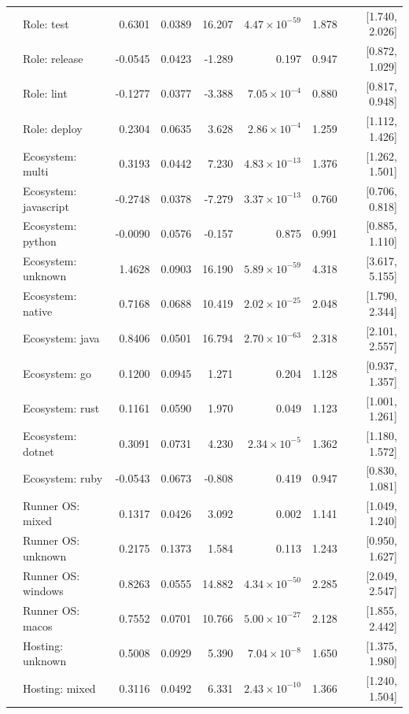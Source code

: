 \documentclass{article}
\begin{document}
\begin{longtable}{>{\raggedright\arraybackslash}p{2.4cm}>{\raggedright\arraybackslash}p{3.8cm}rrrrrr}
 & Role: test & 0.6301 & 0.0389 & 16.207 & $4.47\times10^{-59}$ & 1.878 & [1.740, 2.026] \\
 & Role: release & -0.0545 & 0.0423 & -1.289 & 0.197 & 0.947 & [0.872, 1.029] \\
 & Role: lint & -0.1277 & 0.0377 & -3.388 & $7.05\times10^{-4}$ & 0.880 & [0.817, 0.948] \\
 & Role: deploy & 0.2304 & 0.0635 & 3.628 & $2.86\times10^{-4}$ & 1.259 & [1.112, 1.426] \\
 & Ecosystem: multi & 0.3193 & 0.0442 & 7.230 & $4.83\times10^{-13}$ & 1.376 & [1.262, 1.501] \\
 & Ecosystem: javascript & -0.2748 & 0.0378 & -7.279 & $3.37\times10^{-13}$ & 0.760 & [0.706, 0.818] \\
 & Ecosystem: python & -0.0090 & 0.0576 & -0.157 & 0.875 & 0.991 & [0.885, 1.110] \\
 & Ecosystem: unknown & 1.4628 & 0.0903 & 16.190 & $5.89\times10^{-59}$ & 4.318 & [3.617, 5.155] \\
 & Ecosystem: native & 0.7168 & 0.0688 & 10.419 & $2.02\times10^{-25}$ & 2.048 & [1.790, 2.344] \\
 & Ecosystem: java & 0.8406 & 0.0501 & 16.794 & $2.70\times10^{-63}$ & 2.318 & [2.101, 2.557] \\
 & Ecosystem: go & 0.1200 & 0.0945 & 1.271 & 0.204 & 1.128 & [0.937, 1.357] \\
 & Ecosystem: rust & 0.1161 & 0.0590 & 1.970 & 0.049 & 1.123 & [1.001, 1.261] \\
 & Ecosystem: dotnet & 0.3091 & 0.0731 & 4.230 & $2.34\times10^{-5}$ & 1.362 & [1.180, 1.572] \\
 & Ecosystem: ruby & -0.0543 & 0.0673 & -0.808 & 0.419 & 0.947 & [0.830, 1.081] \\
 & Runner OS: mixed & 0.1317 & 0.0426 & 3.092 & 0.002 & 1.141 & [1.049, 1.240] \\
 & Runner OS: unknown & 0.2175 & 0.1373 & 1.584 & 0.113 & 1.243 & [0.950, 1.627] \\
 & Runner OS: windows & 0.8263 & 0.0555 & 14.882 & $4.34\times10^{-50}$ & 2.285 & [2.049, 2.547] \\
 & Runner OS: macos & 0.7552 & 0.0701 & 10.766 & $5.00\times10^{-27}$ & 2.128 & [1.855, 2.442] \\
 & Hosting: unknown & 0.5008 & 0.0929 & 5.390 & $7.04\times10^{-8}$ & 1.650 & [1.375, 1.980] \\
 & Hosting: mixed & 0.3116 & 0.0492 & 6.331 & $2.43\times10^{-10}$ & 1.366 & [1.240, 1.504] \\

\end{longtable}
\end{document}

